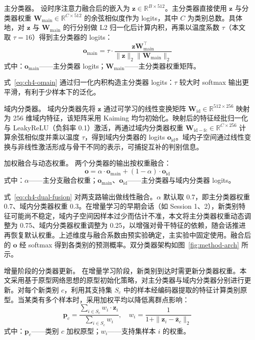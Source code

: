 主分类器。 设时序注意力融合后的嵌入为 $\mathbf{z} \in \mathbb{R}^{B \times 512}$。主分类器直接使用 $\mathbf{z}$ 与分类器权重 $\mathbf{W}_{\mathrm{main}} \in \mathbb{R}^{C \times 512}$ 的余弦相似度作为 logits，其中 $C$ 为类别总数。具体地，对 $\mathbf{z}$ 与 $\mathbf{W}_{\mathrm{main}}$ 的行分别做 L2 归一化后计算内积，再乘以温度系数 $\tau$（本文取 $\tau=16$）得到主分类器的 logits：
\begin{equation}\label{eq:ch4-omain}
  \mathbf{o}_{\mathrm{main}} = \tau \cdot \frac{\mathbf{z} \mathbf{W}_{\mathrm{main}}^\top}{\|\mathbf{z}\|_2 \|\mathbf{W}_{\mathrm{main}}\|_2}
\end{equation}
\noindent 式中：$\mathbf{o}_{\mathrm{main}}$——主分类器 logits；$\mathbf{W}_{\mathrm{main}}$——主分类器权重矩阵。

式~\eqref{eq:ch4-omain} 通过归一化内积构造主分类器 logits：$\tau$ 较大时 softmax 输出更平滑，有利于少样本下的泛化。

域内分类器。 域内分类器先将 $\mathbf{z}$ 通过可学习的线性变换矩阵 $\mathbf{W}_{\mathrm{id}} \in \mathbb{R}^{512 \times 256}$ 映射为 256 维域内特征，该矩阵采用 Kaiming 均匀初始化。映射后的特征经批归一化与 LeakyReLU（负斜率 0.1）激活，再通过域内分类器权重 $\mathbf{W}_{\mathrm{id-fc}} \in \mathbb{R}^{C \times 256}$ 计算余弦相似度并乘以温度 $\tau$，得到域内分类器的 logits $\mathbf{o}_{\mathrm{id}}$。域内子空间通过线性变换与非线性激活形成与骨干不同的表示，可捕捉互补的判别信息。

加权融合与动态权重。 两个分类器的输出按权重融合：
\begin{equation}\label{eq:ch4-dual-fusion}
  \mathbf{o} = \alpha \cdot \mathbf{o}_{\mathrm{main}} + (1-\alpha) \cdot \mathbf{o}_{\mathrm{id}}
\end{equation}
\noindent 式中：$\alpha$——主分支融合权重；$\mathbf{o}_{\mathrm{main}}$、$\mathbf{o}_{\mathrm{id}}$——主分类器与域内分类器 logits。

式~\eqref{eq:ch4-dual-fusion} 对两支路输出做线性融合。$\alpha$ 默认取 0.7，即主分类器权重 0.7、域内分类器权重 0.3。在增量学习的早期会话（如 Session 1、2），新类别特征可能尚不稳定，域内子空间因样本过少而估计不准，本文将主分类器权重动态调整为 0.75、域内分类器权重调整为 0.25，以增强对骨干特征的依赖，随会话推进再恢复默认权重。上述维度与融合系数由预实验确定，主实验中固定使用。融合后的 $\mathbf{o}$ 经 softmax 得到各类别的预测概率。双分类器架构如图~\ref{fig:method-arch} 所示。

增量阶段的分类器更新。 在增量学习阶段，新类别到达时需更新分类器权重。本文采用基于原型网络\cite{snell2017prototypical}思想的原型初始化策略，对主分类器与域内分类器分别进行更新。对每个新类别 $c$，利用其支持集 $S_c$ 中的样本经编码器提取的特征计算类别原型。当某类有多个样本时，采用加权平均以降低离群点影响：
\begin{equation}\label{eq:ch4-prototype-weighted}
  \mathbf{p}_c = \frac{\sum_{i \in S_c} w_i \cdot \mathbf{z}_i}{\sum_{i \in S_c} w_i}, \quad w_i = \frac{1}{1 + \|\mathbf{z}_i - \bar{\mathbf{z}}_c\|_2}
\end{equation}
\noindent 式中：$\mathbf{p}_c$——类别 $c$ 加权原型；$w_i$——支持集样本 $i$ 的权重。

